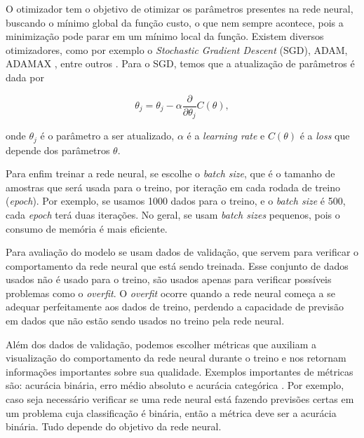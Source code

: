 \documentclass[a4paper,12pt,oneside]{book}
\begin{document}
\par O otimizador tem o objetivo de otimizar os parâmetros presentes na rede neural, buscando o mínimo global da função custo, o que nem sempre acontece, pois a minimização pode parar em um mínimo local da função. Existem diversos otimizadores, como por exemplo o \textit{Stochastic Gradient Descent} (SGD), ADAM, ADAMAX \cite{ADAMAX}, entre outros \cite{gradient_over}. Para o SGD, temos que a atualização de parâmetros é dada por

\begin{equation}\label{eq:SGD}
    \theta_j = \theta_{j} - \alpha \frac{\partial }{\partial \theta_j}C(\theta),
\end{equation}

\par onde $\theta_j$ é o parâmetro a ser atualizado, $\alpha$ é a \textit{learning rate} e $C(\theta)$ é a \textit{loss} que depende dos parâmetros $\theta$.

\par Para enfim treinar a rede neural, se escolhe o \textit{batch size}, que é o tamanho de amostras que será usada para o treino, por iteração em cada rodada de treino (\textit{epoch}). Por exemplo, se usamos 1000 dados para o treino, e o \textit{batch size} é 500, cada \textit{epoch} terá duas iterações. No geral, se usam \textit{batch sizes} pequenos, pois o consumo de memória é mais eficiente.

\par Para avaliação do modelo se usam dados de validação, que servem para verificar o comportamento da rede neural que está sendo treinada. Esse conjunto de dados usados não é usado para o treino, são usados apenas para verificar possíveis problemas como o \textit{overfit}. O \textit{overfit} ocorre quando a rede neural começa a se adequar perfeitamente aos dados de treino, perdendo a capacidade de previsão em dados que não estão sendo usados no treino pela rede neural.

\par Além dos dados de validação, podemos escolher métricas que auxiliam a visualização do comportamento da rede neural durante o treino e nos retornam informações importantes sobre sua qualidade. Exemplos importantes de métricas são: acurácia binária, erro médio absoluto e acurácia categórica \cite{metrics}. Por exemplo, caso seja necessário verificar se uma rede neural está fazendo previsões certas em um problema cuja classificação é binária, então a métrica deve ser a acurácia binária. Tudo depende do objetivo da rede neural.
\end{document}
